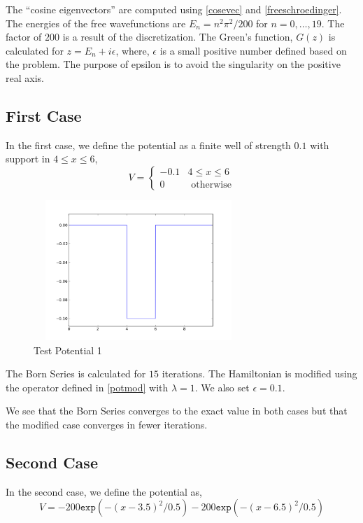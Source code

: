 \documentclass[a4paper,10pt]{report}
\begin{document}
The ``cosine eigenvectors'' are computed using \eqref{cosevec} and \eqref{freeschroedinger}.
The energies of the free wavefunctions are $E_n = n^2\pi^2/200$ for $n=0,\ldots,19$. The factor
of $200$ is a result of the discretization. The Green's function, $G(z)$ is calculated for $z=E_n+i\epsilon$,
where, $\epsilon$ is a small positive number defined based on the problem. The purpose of epsilon is to avoid 
the singularity on the positive real axis.

\subsection{First Case}
In the first case, we define the potential as a finite well of strength $0.1$ with support in $4 \leq x \leq 6$,
\begin{equation}\label{potentialdef1}
V = \begin{cases}
-0.1 &\mbox{} 4\leq x\leq 6\\
0 &\mbox{ otherwise}
\end{cases} 
\end{equation}

\begin{figure}[ht]
\centering
\includegraphics[width=225pt, height=150pt]{potential1d1.png}
\caption[\textwidth]{Test Potential 1}
% 
\end{figure}

The Born Series is calculated for $15$ iterations. The Hamiltonian is modified using the operator defined in \eqref{potmod} with
$\lambda=1$.  We also set $\epsilon=0.1$.

We see that the Born Series converges to the exact value in both cases but that the modified case converges in fewer iterations.

\subsection{Second Case}
In the second case, we define the potential as, 
\begin{equation}\label{potentialdef2}
V = -200\mathtt{exp}(-(x-3.5)^2/0.5)-200\mathtt{exp}(-(x-6.5)^2/0.5)
\end{equation}
\end{document}
